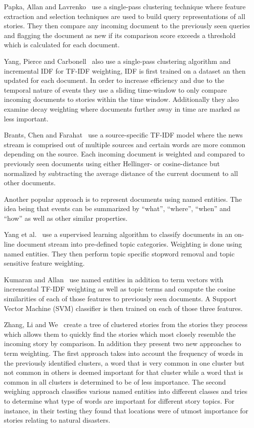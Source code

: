 Papka, Allan and Lavrenko~\cite{papka1998online} use a single-pass clustering technique where feature extraction and selection techniques are used to build query representations of all stories. They then compare any incoming document to the previously seen queries and flagging the document as new if its comparison score exceeds a threshold which is calculated for each document.

Yang, Pierce and Carbonell~\cite{yang1998study} also use a single-pass clustering algorithm and incremental IDF for TF-IDF weighting, IDF is first trained on a dataset an then updated for each document. In order to increase efficiency and due to the temporal nature of events they use a sliding time-window to only compare incoming documents to stories within the time window. Additionally they also examine decay weighting where documents further away in time are marked as less important.

Brants, Chen and Farahat~\cite{brants2003system} use a source-specific TF-IDF model where the news stream is comprised out of multiple sources and certain words are more common depending on the source. Each incoming document is weighted and compared to previously seen documents using either Hellinger- or cosine-distance but normalized by subtracting the average distance of the current document to all other documents. %

Another popular approach is to represent documents using named entities. The idea being that events can be summarized  by ``what'', ``where'', ``when'' and ``how'' as well as other similar properties. %

Yang et al.~\cite{yang2002topic} use a supervised learning algorithm to classify documents in an on-line document stream into pre-defined topic categories. Weighting is done using named entities. They then perform topic specific stopword removal and topic sensitive feature weighting.

Kumaran and Allan~\cite{kumaran2005using} use named entities in addition to term vectors with incremental TF-IDF weighting as well as topic terms and compute the cosine similarities of each of those features to previously seen documents. A Support Vector Machine (SVM) classifier is then trained on each of those three features.

Zhang, Li and We~\cite{zhang2007new} create a tree of clustered stories from the stories they process which allows them to quickly find the stories which most closely resemble the incoming story by comparison. In addition they present two new approaches to term weighting. The first approach takes into account the frequency of words in the previously identified clusters, a word that is very common in one cluster but not common in others is deemed important for that cluster while a word that is common in all clusters is determined to be of less importance. The second weighing approach classifies various named entities into different classes and tries to determine what type of words are important for different story topics. For instance, in their testing they found that locations were of utmost importance for stories relating to natural disasters.

